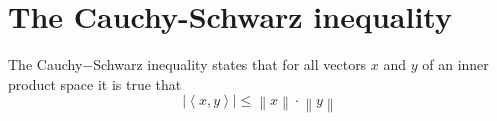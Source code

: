 \section{The Cauchy-Schwarz inequality}

The Cauchy$-$Schwarz inequality states that for all vectors $x$ and $y$ of an inner product space it is true that
$$\left | \left \langle x, y \right \rangle \right | \leq \left \| x \right \| \cdot \left \| y \right \|$$



